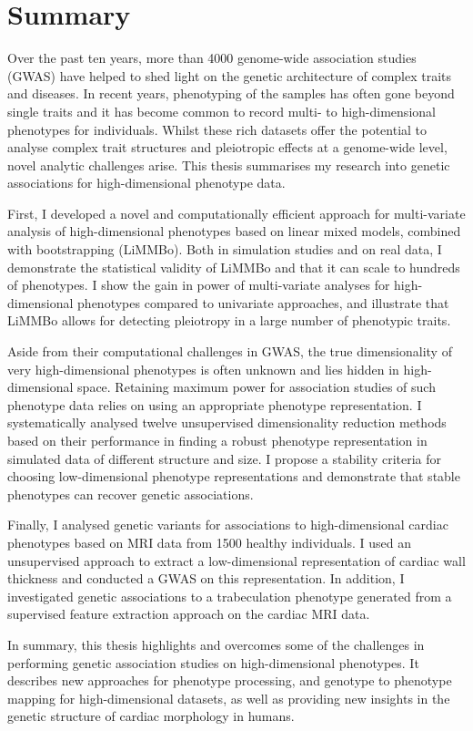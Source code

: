 \clearpage
\chapter*{Summary}
\label{section:summary}

\begin{singlespace}
Over the past ten years, more than \num{4000} genome-wide association studies (GWAS) have helped to shed light on the genetic architecture of complex traits and diseases. In recent years, phenotyping of the samples has often gone beyond single traits and it has become common to record multi- to high-dimensional phenotypes for individuals. Whilst these rich datasets offer the potential to analyse complex trait structures and pleiotropic effects at a genome-wide level, novel analytic challenges arise. This thesis summarises my research into genetic associations for high-dimensional phenotype data.

First, I developed a novel and computationally efficient approach for multi-variate analysis of high-dimensional phenotypes based on linear mixed models, combined with bootstrapping (LiMMBo). Both in simulation studies and on real data, I demonstrate the statistical validity of LiMMBo and that it can scale to hundreds of phenotypes. I show the gain in power of multi-variate analyses for high-dimensional phenotypes compared to univariate approaches, and illustrate that LiMMBo allows for detecting pleiotropy in a large number of phenotypic traits.

Aside from their computational challenges in GWAS, the true dimensionality of very high-dimensional phenotypes is often unknown and lies hidden in high-dimensional space. Retaining maximum power for association studies of such phenotype data relies on using an appropriate phenotype representation. I systematically analysed twelve unsupervised dimensionality reduction methods based on their performance in finding a robust phenotype representation in simulated data of different structure and size. I propose a stability criteria for choosing low-dimensional phenotype representations and demonstrate that stable phenotypes can recover genetic associations.

Finally, I analysed genetic variants for associations to high-dimensional cardiac phenotypes based on MRI data from \num{1500} healthy individuals. I used an unsupervised approach to extract a low-dimensional representation of cardiac wall thickness and conducted a GWAS on this representation. In addition, I investigated genetic associations to a trabeculation phenotype generated from a supervised feature extraction approach on the cardiac MRI data.

In summary, this thesis highlights and overcomes some of the challenges in performing genetic association studies on high-dimensional phenotypes. It describes new approaches for phenotype processing, and genotype to phenotype mapping for high-dimensional datasets, as well as providing new insights in the genetic structure of cardiac morphology in humans.


\end{singlespace}



